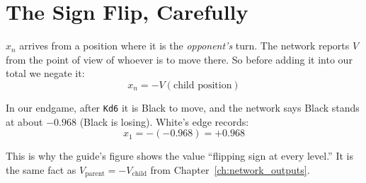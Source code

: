\section{The Sign Flip, Carefully}

$x_n$ arrives from a position where it is the \textit{opponent's} turn. The network reports $V$ from the point of view of whoever is to move there. So before adding it into our total we negate it:
\begin{equation}
  x_n = -V(\text{child position})
\end{equation}

In our endgame, after \texttt{Kd6} it is Black to move, and the network says Black stands at about \textbf{$-0.968$} (Black is losing). White's edge records:
\begin{equation}
  x_1 = -(-0.968) = \mathbf{+0.968}
\end{equation}

\begin{center}
\begin{minipage}{\linewidth}
\centering

\label{fig:signflip}
\end{minipage}
\end{center}

This is why the guide's figure shows the value ``flipping sign at every level.'' It is the same fact as $V_{\text{parent}} = -V_{\text{child}}$ from Chapter~\ref{ch:network_outputs}.
